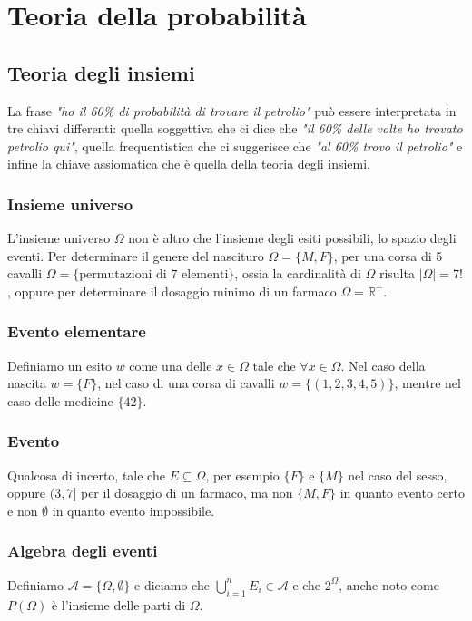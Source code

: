 \documentclass[11pt]{report}
\begin{document}
\chapter{Teoria della probabilità}

\section{Teoria degli insiemi}
La frase \textit{"ho il 60\% di probabilità di trovare il petrolio"} può essere interpretata in tre chiavi differenti: quella soggettiva che ci dice che \textit{"il 60\% delle volte ho trovato petrolio qui"}, quella frequentistica che ci suggerisce che \textit{"al 60\% trovo il petrolio"} e infine la chiave assiomatica che è quella della teoria degli insiemi.
\subsection{Insieme universo}
L'insieme universo $\Omega$ non è altro che l'insieme degli esiti possibili, lo spazio degli eventi. Per determinare il genere del nascituro $\Omega = \{M,F\}$, per una corsa di 5 cavalli $\Omega = \{\text{permutazioni di 7 elementi}\}$, ossia la cardinalità di $\Omega$ risulta $\mid \Omega \mid = 7!$, oppure per determinare il dosaggio minimo di un farmaco $\Omega = \mathbb{R}^+$.
\subsection{Evento elementare}
Definiamo un esito $w$ come una delle $x \in \Omega$ tale che $\forall x \in \Omega$. Nel caso della nascita $w = \{F\}$, nel caso di una corsa di cavalli $w = \{(1,2,3,4,5)\}$, mentre nel caso delle medicine $\{42\}$.
\subsection{Evento}
Qualcosa di incerto, tale che $E \subseteq \Omega$, per esempio $\{F\}$ e  $\{M\}$ nel caso del sesso, oppure $(3,7]$ per il dosaggio di un farmaco, ma non $\{M,F\}$ in quanto evento certo e non $\emptyset$ in quanto evento impossibile.
\subsection{Algebra degli eventi}
Definiamo $\mathcal{A} = \{\Omega,\emptyset\}$ e diciamo che $\bigcup_{i=1}^{n}E_i \in \mathcal{A}$ e che $2^{\Omega}$, anche noto come $P(\Omega)$ è l'insieme delle parti di $\Omega$.
\end{document}
